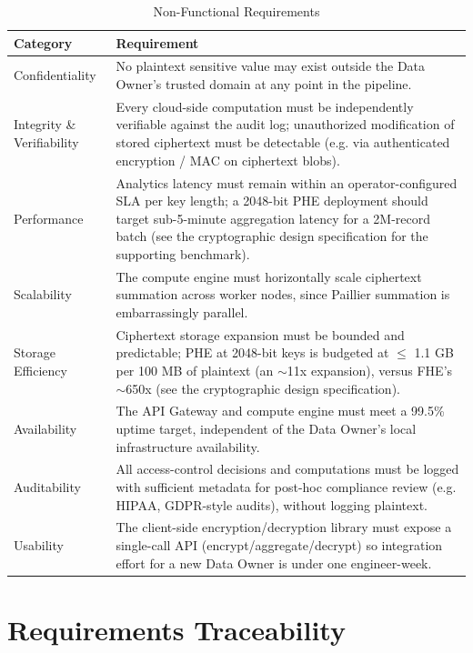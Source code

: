 \documentclass[12pt]{article}
\begin{document}
\begin{table}[H]
\centering
\begin{tabularx}{\textwidth}{l X}
\toprule
\textbf{Category} & \textbf{Requirement} \\
\midrule
Confidentiality & No plaintext sensitive value may exist outside the Data Owner's trusted domain at any point in the pipeline. \\
Integrity \& Verifiability & Every cloud-side computation must be independently verifiable against the audit log; unauthorized modification of stored ciphertext must be detectable (e.g. via authenticated encryption / MAC on ciphertext blobs). \\
Performance & Analytics latency must remain within an operator-configured SLA per key length; a 2048-bit PHE deployment should target sub-5-minute aggregation latency for a 2M-record batch (see the cryptographic design specification for the supporting benchmark). \\
Scalability & The compute engine must horizontally scale ciphertext summation across worker nodes, since Paillier summation is embarrassingly parallel. \\
Storage Efficiency & Ciphertext storage expansion must be bounded and predictable; PHE at 2048-bit keys is budgeted at $\leq$ 1.1 GB per 100 MB of plaintext (an $\sim$11x expansion), versus FHE's $\sim$650x (see the cryptographic design specification). \\
Availability & The API Gateway and compute engine must meet a 99.5\% uptime target, independent of the Data Owner's local infrastructure availability. \\
Auditability & All access-control decisions and computations must be logged with sufficient metadata for post-hoc compliance review (e.g. HIPAA, GDPR-style audits), without logging plaintext. \\
Usability & The client-side encryption/decryption library must expose a single-call API (encrypt/aggregate/decrypt) so integration effort for a new Data Owner is under one engineer-week. \\
\bottomrule
\end{tabularx}
\caption{Non-Functional Requirements}
\label{tab:nonfunctional_reqs}
\end{table}

\section{Requirements Traceability}
\end{document}
